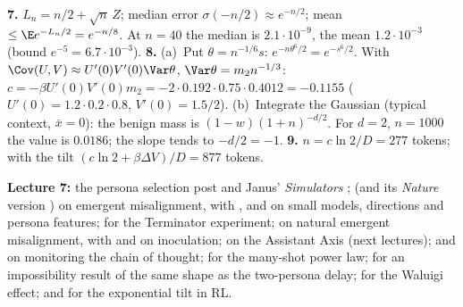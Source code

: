\textbf{7.} $L_n=n/2+\sqrt n\,Z$; median error $\sigma(-n/2)\approx e^{-n/2}$; mean $\le\E e^{-L_n/2}=e^{-n/8}$. At $n=40$ the median is $2.1\cdot10^{-9}$, the mean $1.2\cdot10^{-3}$ (bound $e^{-5}=6.7\cdot10^{-3}$). \quad
\textbf{8.} (a)~Put $\theta=n^{-1/6}s$: $e^{-n\theta^6/2}=e^{-s^6/2}$. With $\Cov(U,V)\approx U'(0)V'(0)\Var\theta$, $\Var\theta=m_2n^{-1/3}$: $c=-\beta U'(0)V'(0)m_2=-2\cdot0.192\cdot0.75\cdot0.4012=-0.1155$ ($U'(0)=1.2\cdot0.2\cdot0.8$, $V'(0)=1.5/2$). (b)~Integrate the Gaussian (typical context, $\bar x=0$): the benign mass is $(1-w)(1+n)^{-d/2}$. For $d=2$, $n=1000$ the value is $0.0186$; the slope tends to $-d/2=-1$. \quad
\textbf{9.} $n=c\ln2/D=277$ tokens; with the tilt $(c\ln2+\beta\Delta V)/D=877$ tokens.

\textbf{Lecture 7:} the persona selection post \citep{anthropic2026persona} and Janus' \emph{Simulators} \citep{janus2022}; \citet{betley2025} (and its \emph{Nature} version \citep{betley2026nature}) on emergent misalignment, with \citet{turner2025}, \citet{soligo2025} and \citet{wang2025persona} on small models, directions and persona features; \citet{betleyweird2025} for the Terminator experiment; \citet{macdiarmid2025} on natural emergent misalignment, with \citet{tan2025} and \citet{wichers2025} on inoculation; \citet{lu2026assistant} on the Assistant Axis (next lectures); \citet{korbak2025} and \citet{baker2025} on monitoring the chain of thought; \citet{anil2024} for the many-shot power law; \citet{wolf2023} for an impossibility result of the same shape as the two-persona delay; \citet{nardo2023} for the Waluigi effect; \citet{rafailov2023} and \citet{korbak2022} for the exponential tilt in RL.

